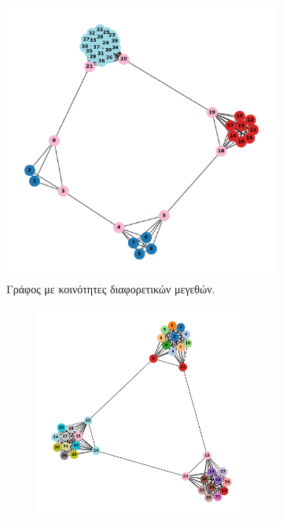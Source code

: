 \documentclass[12pt, letterpaper]{article}
\begin{document}
\begin{figure}
  \centering
  \begin{subfigure}{0.3\linewidth}
      \centering
      \includegraphics[width=\linewidth]{different_size_communities.pdf}
      \caption{Γράφος με κοινότητες διαφορετικών μεγεθών.}
      \label{different_sizes}
  \end{subfigure}
  \begin{subfigure}{0.66\linewidth}
    \centering
    \begin{subfigure}{0.45\linewidth}
        \centering
        \includegraphics[width=\linewidth]{nonconnected_ssize_dcs0.011.pdf}

\end{subfigure}
\end{subfigure}
\end{figure}
\end{document}

